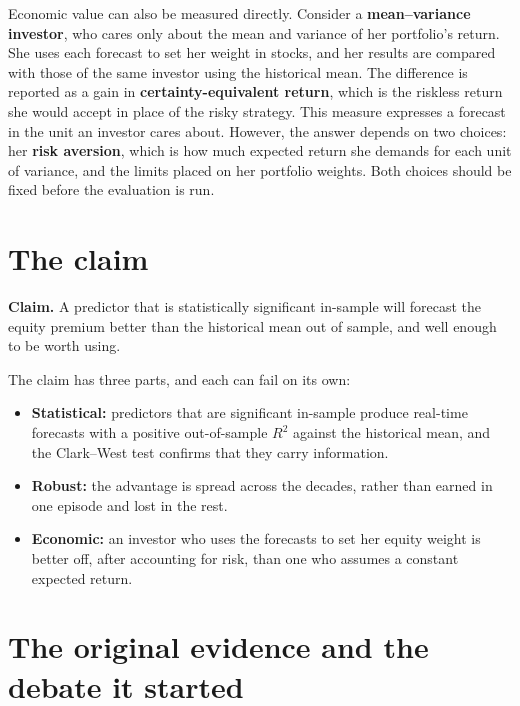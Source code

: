 Economic value can also be measured directly. Consider a \textbf{mean--variance investor}, who cares only about the mean and variance of her portfolio's return. She uses each forecast to set her weight in stocks, and her results are compared with those of the same investor using the historical mean. The difference is reported as a gain in \textbf{certainty-equivalent return}, which is the riskless return she would accept in place of the risky strategy. This measure expresses a forecast in the unit an investor cares about. However, the answer depends on two choices: her \textbf{risk aversion}, which is how much expected return she demands for each unit of variance, and the limits placed on her portfolio weights. Both choices should be fixed before the evaluation is run.



\section{The claim}
\label{sec:05-claim}

\begin{callout}
\textbf{Claim.} A predictor that is statistically significant in-sample will forecast the equity premium better than the historical mean out of sample, and well enough to be worth using.
\end{callout}

The claim has three parts, and each can fail on its own:

\begin{itemize}
  \item \textbf{Statistical:} predictors that are significant in-sample produce real-time forecasts with a positive out-of-sample $R^2$ against the historical mean, and the Clark--West test confirms that they carry information.
  \item \textbf{Robust:} the advantage is spread across the decades, rather than earned in one episode and lost in the rest.
  \item \textbf{Economic:} an investor who uses the forecasts to set her equity weight is better off, after accounting for risk, than one who assumes a constant expected return.
\end{itemize}

\section{The original evidence and the debate it started}
\label{sec:05-evidence}

